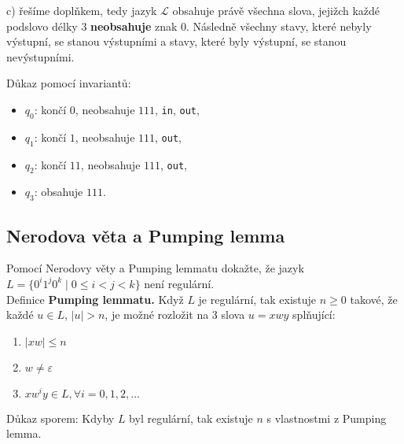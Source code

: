 \noindent
c) řešíme doplňkem, tedy jazyk $\mathcal{L}$ obsahuje právě všechna slova, jejižch každé podslovo délky $3$ \textbf{neobsahuje} 
znak $0$. Následně všechny stavy, které nebyly výstupní, se stanou výstupními a stavy, které byly výstupní, se stanou 
nevýstupními. 


Důkaz pomocí invariantů: 
\begin{itemize}[noitemsep]
    \item $q_0$: končí $0$, neobsahuje $111$, \texttt{in}, \texttt{out},
    \item $q_1$: končí $1$, neobsahuje $111$, \texttt{out},
    \item $q_2$: končí $11$, neobsahuje $111$, \texttt{out},
    \item $q_3$: obsahuje $111$. 
\end{itemize}

\subsection{Nerodova věta a Pumping lemma}
Pomocí Nerodovy věty a Pumping lemmatu dokažte, že jazyk $L = \{0^i 1^j 0^k \mid 0 \leq i < j <k\}$ není regulární.\\

\noindent
Definice \textbf{Pumping lemmatu.} Když $L$ je regulární, tak existuje $n \geq 0$ takové, že každé ${u \in L}$,
$|u| > n$, je možné rozložit na 3 slova $u = xwy$ splňující:

\begin{enumerate}[1), noitemsep]
    \item $|xw| \leq n$
    \item $w \not= \varepsilon$
    \item $xw^i y \in L, \forall i = 0, 1, 2, ...$
\end{enumerate}
Důkaz sporem:
Kdyby $L$ byl regulární, tak existuje $n$ s vlastnostmi z Pumping lemma.

